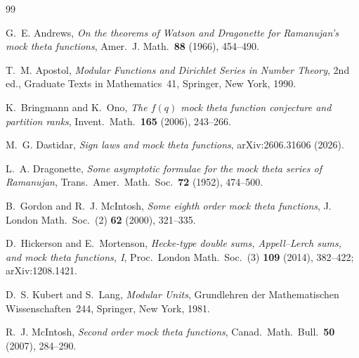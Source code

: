 \documentclass[11pt]{amsart}
\theoremstyle{definition}
\theoremstyle{remark}
\numberwithin{equation}{section}
\begin{document}
\begin{thebibliography}{99}

 G.~E. Andrews, \emph{On the theorems of Watson and Dragonette for Ramanujan's mock theta functions}, Amer.\ J. Math.\ \textbf{88} (1966), 454--490.

 T.~M. Apostol, \emph{Modular Functions and Dirichlet Series in Number Theory}, 2nd ed., Graduate Texts in Mathematics~41, Springer, New York, 1990.

 K.~Bringmann and K.~Ono, \emph{The $f(q)$ mock theta function conjecture and partition ranks}, Invent.\ Math.\ \textbf{165} (2006), 243--266.

 M.~G. Dastidar, \emph{Sign laws and mock theta functions}, arXiv:2606.31606 (2026).

 L.~A. Dragonette, \emph{Some asymptotic formulae for the mock theta series of Ramanujan}, Trans.\ Amer.\ Math.\ Soc.\ \textbf{72} (1952), 474--500.

 B.~Gordon and R.~J. McIntosh, \emph{Some eighth order mock theta functions}, J. London Math.\ Soc.\ (2) \textbf{62} (2000), 321--335.

 D.~Hickerson and E.~Mortenson, \emph{Hecke-type double sums, Appell--Lerch sums, and mock theta functions, I}, Proc.\ London Math.\ Soc.\ (3) \textbf{109} (2014), 382--422; arXiv:1208.1421.

 D.~S. Kubert and S.~Lang, \emph{Modular Units}, Grundlehren der Mathematischen Wissenschaften~244, Springer, New York, 1981.

 R.~J. McIntosh, \emph{Second order mock theta functions}, Canad.\ Math.\ Bull.\ \textbf{50} (2007), 284--290.

\end{thebibliography}
\end{document}
